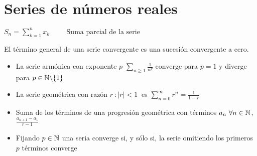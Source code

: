 \section{Series de números reales}
\begin{center}
	$ S_n = \sum_{k=1}^{n} x_k \hspace{1cm}\text{Suma parcial de la serie}$
\end{center}
El término general de una serie convergente es una sucesión convergente a cero.
\begin{itemize}
	\item La serie armónica con exponente $p$ $\sum_{n\geq 1} \frac{1}{n^p}$ converge para $p=1$ y diverge para $p\in\mathbb{N}\backslash\{1\}$
	\item La serie geométrica con razón $r \ : |r|<1 \ $ es $\sum_{n=0}^{\infty} r^n = \frac{1}{1-r}$
	\item Suma de los términos de una progresión geométrica con términos $a_n \ \forall n\in\mathbb{N}$, $\frac{a_{n+1}-a_1}{r-1}$
	\item Fijando $p\in\mathbb{N}$ una seria converge si, y sólo si, la serie omitiendo los primeros $p$ términos converge
\end{itemize}